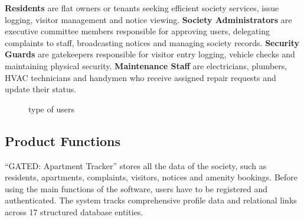 \documentclass[a4paper,10pt]{scrartcl}
\numberwithin{figure}{section}
\begin{document}
\textbf{Residents} are flat owners or tenants seeking efficient society services, issue logging, visitor management and notice viewing. \textbf{Society Administrators} are executive committee members responsible for approving users, delegating complaints to staff, broadcasting notices and managing society records. \textbf{Security Guards} are gatekeepers responsible for visitor entry logging, vehicle checks and maintaining physical security. \textbf{Maintenance Staff} are electricians, plumbers, HVAC technicians and handymen who receive assigned repair requests and update their status.

\begin{figure}[H]
\centering
{}
\caption{type of users}
\end{figure}

\subsection{Product Functions}
``GATED: Apartment Tracker'' stores all the data of the society, such as residents, apartments, complaints, visitors, notices and amenity bookings. Before using the main functions of the software, users have to be registered and authenticated. The system tracks comprehensive profile data and relational links across 17 structured database entities.
\end{document}
